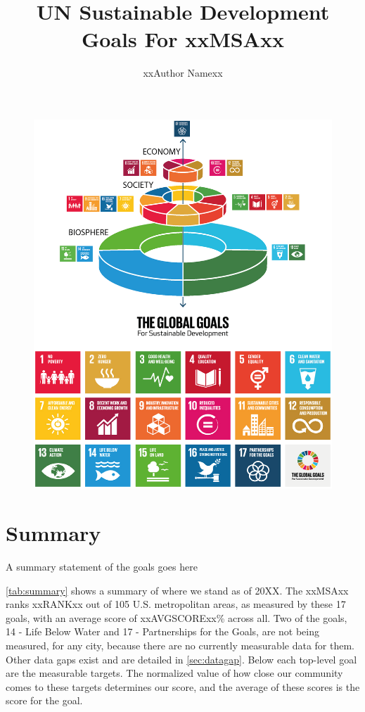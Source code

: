 \documentclass[12pt]{article}
\author{xxAuthor Namexx}
\title{UN Sustainable Development Goals For xxMSAxx}
\begin{document}

\begin{figure}[ht]
	\centering
	\includegraphics[width=\linewidth]{../figs/pyramid-figure4.png}
	\label{fig:cover}
\end{figure}

\clearpage

\maketitle

\section*{Summary}
A summary statement of the goals goes here

\cref{tab:summary} shows a summary of where we stand as of 20XX. The xxMSAxx ranks xxRANKxx out of 105 U.S. metropolitan areas, as measured by these 17 goals, with an average score of xxAVGSCORExx\% across all. Two of the goals, 14 - Life Below Water and 17 - Partnerships for the Goals, are not being measured, for any city, because there are no currently measurable data for them. Other data gaps exist and are detailed in \cref{sec:datagap}. Below each top-level goal are the measurable targets. The normalized value of how close our community comes to these targets determines our score, and the average of these scores is the score for the goal.
\end{document}
